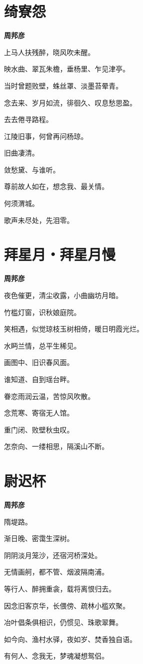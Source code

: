 \documentclass[12pt,a4paper]{ctexbook}
\begin{document}
\section{绮寮怨}
\textbf{周邦彦}\par\vspace{0.5em}
上马人扶残醉，晓风吹未醒。\par
映水曲、翠瓦朱檐，垂杨里、乍见津亭。\par
当时曾题败壁，蛛丝罩、淡墨苔晕青。\par
念去来、岁月如流，徘徊久、叹息愁思盈。\par
去去倦寻路程。\par
江陵旧事，何曾再问杨琼。\par
旧曲凄清。\par
敛愁黛、与谁听。\par
尊前故人如在，想念我、最关情。\par
何须渭城。\par
歌声未尽处，先泪零。\par

\section{拜星月・拜星月慢}
\textbf{周邦彦}\par\vspace{0.5em}
夜色催更，清尘收露，小曲幽坊月暗。\par
竹槛灯窗，识秋娘庭院。\par
笑相遇，似觉琼枝玉树相倚，暖日明霞光烂。\par
水眄兰情，总平生稀见。\par
画图中、旧识春风面。\par
谁知道、自到瑶台畔。\par
眷恋雨润云温，苦惊风吹散。\par
念荒寒、寄宿无人馆。\par
重门闭、败壁秋虫叹。\par
怎奈向、一缕相思，隔溪山不断。\par

\section{尉迟杯}
\textbf{周邦彦}\par\vspace{0.5em}
隋堤路。\par
渐日晚、密霭生深树。\par
阴阴淡月笼沙，还宿河桥深处。\par
无情画舸，都不管、烟波隔南浦。\par
等行人、醉拥重衾，载将离恨归去。\par
因念旧客京华，长偎傍、疏林小槛欢聚。\par
冶叶倡条俱相识，仍惯见、珠歌翠舞。\par
如今向、渔村水驿，夜如岁、焚香独自语。\par
有何人、念我无，梦魂凝想鸳侣。\par
\end{document}

